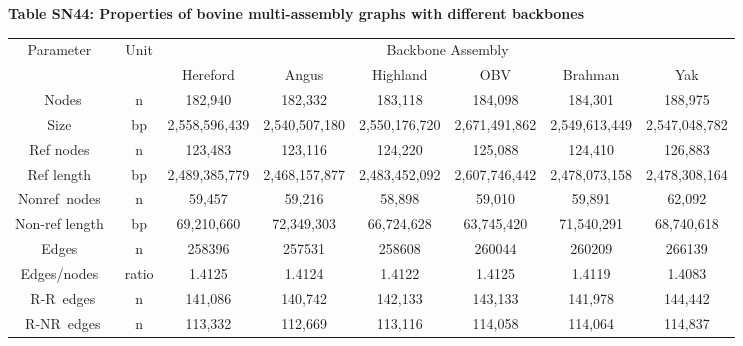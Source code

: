 \documentclass[../main.tex]{subfiles}
\begin{document}
\begin{flushleft}
\textbf{\hypertarget{Table SN44}{Table SN44}: Properties of bovine multi-assembly graphs with different backbones}
\begin{center}
    \scriptsize
    \begin{tabular}{|c|c|c|c|c|c|c|c|}
    \hline
    \multirow{2}{*}{Parameter~} & \multirow{2}{*}{Unit} & \multicolumn{6}{c|}{Backbone Assembly}                                                         \\
    \cline{3-8}
                                &                       & Hereford      & Angus         & Highland      & OBV           & Brahman       & Yak            \\
    \hline
    Nodes                       & n                     & 182,940       & 182,332       & 183,118       & 184,098       & 184,301       & 188,975        \\
    \hline
    Size~                       & bp                    & 2,558,596,439 & 2,540,507,180 & 2,550,176,720 & 2,671,491,862 & 2,549,613,449 & 2,547,048,782  \\
    \hline
    Ref nodes~                  & n                     & 123,483       & 123,116       & 124,220       & 125,088       & 124,410       & 126,883        \\
    \hline
    Ref length~                 & bp                    & 2,489,385,779 & 2,468,157,877 & 2,483,452,092 & 2,607,746,442 & 2,478,073,158 & 2,478,308,164  \\
    \hline
    Nonref~nodes~               & n                     & 59,457        & 59,216        & 58,898        & 59,010        & 59,891        & 62,092         \\
    \hline
    Non-ref length~             & bp                    & 69,210,660    & 72,349,303    & 66,724,628    & 63,745,420    & 71,540,291    & 68,740,618     \\
    \hline
    Edges~                      & n                     & 258396        & 257531        & 258608        & 260044        & 260209        & 266139         \\
    \hline
    Edges/nodes~                & ratio                 & 1.4125        & 1.4124        & 1.4122        & 1.4125        & 1.4119        & 1.4083         \\
    \hline
    R-R~edges                   & n                     & 141,086       & 140,742       & 142,133       & 143,133       & 141,978       & 144,442        \\
    \hline
    R-NR~edges                  & n                     & 113,332       & 112,669       & 113,116       & 114,058       & 114,064       & 114,837        \\

\end{tabular}
\end{center}
\end{flushleft}
\end{document}
